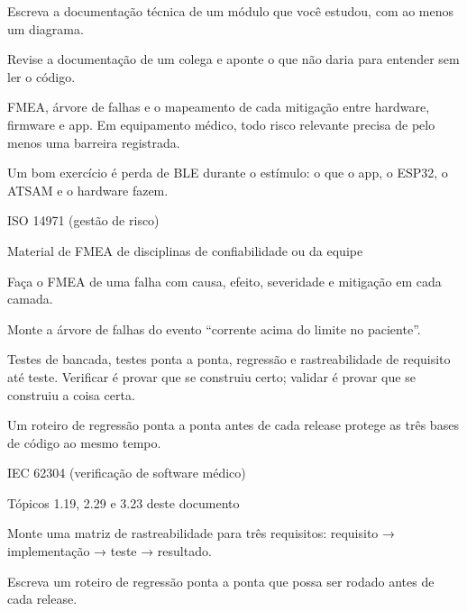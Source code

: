 \begin{pratique}
  \item Escreva a documentação técnica de um módulo que você estudou, com ao menos um diagrama.
  \item Revise a documentação de um colega e aponte o que não daria para entender sem ler o código.
\end{pratique}

FMEA, árvore de falhas e o mapeamento de cada mitigação entre hardware, firmware e app. Em equipamento médico, todo risco relevante precisa de pelo menos uma barreira registrada.

\begin{noproduto}
Um bom exercício é perda de BLE durante o estímulo: o que o app, o ESP32, o ATSAM e o hardware fazem.
\end{noproduto}

\begin{paraestudar}
  \item ISO 14971 (gestão de risco)
  \item Material de FMEA de disciplinas de confiabilidade ou da equipe
\end{paraestudar}

\begin{pratique}
  \item Faça o FMEA de uma falha com causa, efeito, severidade e mitigação em cada camada.
  \item Monte a árvore de falhas do evento “corrente acima do limite no paciente”.
\end{pratique}

Testes de bancada, testes ponta a ponta, regressão e rastreabilidade de requisito até teste. Verificar é provar que se construiu certo; validar é provar que se construiu a coisa certa.

\begin{noproduto}
Um roteiro de regressão ponta a ponta antes de cada release protege as três bases de código ao mesmo tempo.
\end{noproduto}

\begin{paraestudar}
  \item IEC 62304 (verificação de software médico)
  \item Tópicos 1.19, 2.29 e 3.23 deste documento
\end{paraestudar}

\begin{pratique}
  \item Monte uma matriz de rastreabilidade para três requisitos: requisito → implementação → teste → resultado.
  \item Escreva um roteiro de regressão ponta a ponta que possa ser rodado antes de cada release.
\end{pratique}

